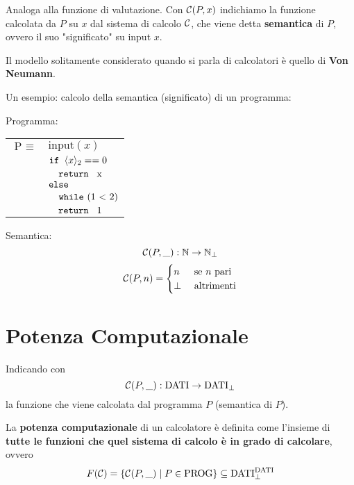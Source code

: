 Analoga alla funzione di valutazione. Con $\mathcal{C}(P,x)$ indichiamo la funzione calcolata da $P$ su $x$ dal sistema di calcolo $\mathcal{C}$, che viene detta \textbf{semantica} di $P$, ovvero il suo "significato" su input $x$.

Il modello solitamente considerato quando si parla di calcolatori è quello di \textbf{Von Neumann}.

Un esempio: calcolo della semantica (significato) di un programma:

\begin{minipage}{0.45\textwidth}
    Programma:
    \begin{center}
        \begin{tabular}{r|l|}
            \cline{2-2}
            $\text{P } \equiv$	& $\text{input}(x)$ \\
            & $\text{\texttt{if }} \langle x \rangle_2 == 0$ \\
            & $\quad \text{\texttt{return } x}$ \\
            & $\text{\texttt{else}}$ \\
            & $\quad \text{\texttt{while} (1 < 2)}$\\
            & $\quad \text{\texttt{return } 1}$ \\
            \cline{2-2}
        \end{tabular}
    \end{center}
\end{minipage}
\hfill 
\begin{minipage}{0.45\textwidth}
    Semantica:
    $$ \mathcal{C} (P, \_): \mathbb{N} \rightarrow \mathbb{N}_\bot $$
    $$ \mathcal{C} (P, n) = \begin{cases}
        n & \text{ se } n \text{ pari} \\
        \bot & \text{ altrimenti}
    \end{cases}$$
\end{minipage}

\section{Potenza Computazionale}

Indicando con 
$$ \mathcal{C} (P, \_): \text{DATI} \rightarrow \text{DATI}_{\bot} $$
la funzione che viene calcolata dal programma $P$ (semantica di $P$).

La \textbf{potenza computazionale} di un calcolatore è definita come l'insieme di \textbf{tutte le funzioni che quel sistema di calcolo è in grado di calcolare}, ovvero
$$ F(\mathcal{C}) = \{\mathcal{C} (P, \_) \mid P \in \text{PROG}\} \subseteq \text{DATI}_\bot^{\text{DATI}} $$


